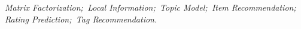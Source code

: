 \hspace{-0.5cm}
{} \textit{Matrix Factorization;\, Local Information;\, Topic Model;\, Item Recommendation;\, Rating Prediction;\, Tag Recommendation.
}
































